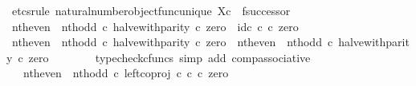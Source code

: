 \begin{isabellebody}
%
\isadelimproof
%
\endisadelimproof
%
\isatagproof
{}\isamarkupfalse%
\ {\isacharparenleft}{\kern0pt}etcs{\isacharunderscore}{\kern0pt}rule\ natural{\isacharunderscore}{\kern0pt}number{\isacharunderscore}{\kern0pt}object{\isacharunderscore}{\kern0pt}func{\isacharunderscore}{\kern0pt}unique{\isacharbrackleft}{\kern0pt}\ X{\isacharequal}{\kern0pt}{\isachardoublequoteopen}{\isasymnat}\isactrlsub c{\isachardoublequoteclose}{\isacharcomma}{\kern0pt}\ \ f{\isacharequal}{\kern0pt}{\isachardoublequoteopen}successor{\isachardoublequoteclose}{\isacharbrackright}{\kern0pt}{\isacharparenright}{\kern0pt}\isanewline
\ \ \isamarkupfalse%
\ {\isachardoublequoteopen}{\isacharparenleft}{\kern0pt}nth{\isacharunderscore}{\kern0pt}even\ {\isasymamalg}\ nth{\isacharunderscore}{\kern0pt}odd\ {\isasymcirc}\isactrlsub c\ halve{\isacharunderscore}{\kern0pt}with{\isacharunderscore}{\kern0pt}parity{\isacharparenright}{\kern0pt}\ {\isasymcirc}\isactrlsub c\ zero\ {\isacharequal}{\kern0pt}\ id\isactrlsub c\ {\isasymnat}\isactrlsub c\ {\isasymcirc}\isactrlsub c\ zero{\isachardoublequoteclose}\isanewline
\ \ \isamarkupfalse%
\ {\isacharminus}{\kern0pt}\isanewline
\ \ \ \ \isamarkupfalse%
\ {\isachardoublequoteopen}{\isacharparenleft}{\kern0pt}nth{\isacharunderscore}{\kern0pt}even\ {\isasymamalg}\ nth{\isacharunderscore}{\kern0pt}odd\ {\isasymcirc}\isactrlsub c\ halve{\isacharunderscore}{\kern0pt}with{\isacharunderscore}{\kern0pt}parity{\isacharparenright}{\kern0pt}\ {\isasymcirc}\isactrlsub c\ zero\ {\isacharequal}{\kern0pt}\ nth{\isacharunderscore}{\kern0pt}even\ {\isasymamalg}\ nth{\isacharunderscore}{\kern0pt}odd\ {\isasymcirc}\isactrlsub c\ halve{\isacharunderscore}{\kern0pt}with{\isacharunderscore}{\kern0pt}parity\ {\isasymcirc}\isactrlsub c\ zero{\isachardoublequoteclose}\isanewline
\ \ \ \ \ \ \isamarkupfalse%
\ {\isacharparenleft}{\kern0pt}typecheck{\isacharunderscore}{\kern0pt}cfuncs{\isacharcomma}{\kern0pt}\ simp\ add{\isacharcolon}{\kern0pt}\ comp{\isacharunderscore}{\kern0pt}associative{}{\isacharparenright}{\kern0pt}\isanewline
\ \ \ \ \isamarkupfalse%
\ \isamarkupfalse%
\ {\isachardoublequoteopen}{\isachardot}{\kern0pt}{\isachardot}{\kern0pt}{\isachardot}{\kern0pt}\ {\isacharequal}{\kern0pt}\ nth{\isacharunderscore}{\kern0pt}even\ {\isasymamalg}\ nth{\isacharunderscore}{\kern0pt}odd\ {\isasymcirc}\isactrlsub c\ left{\isacharunderscore}{\kern0pt}coproj\ {\isasymnat}\isactrlsub c\ {\isasymnat}\isactrlsub c\ {\isasymcirc}\isactrlsub c\ zero{\isachardoublequoteclose}\isanewline

\end{isabellebody}
